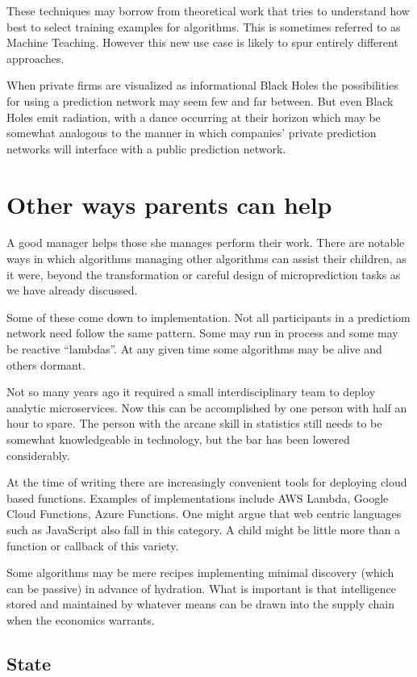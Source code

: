 These techniques may borrow from theoretical work that tries to understand how best to select training examples for algorithms. This is sometimes referred to as Machine Teaching. However this new use case is likely to spur entirely different approaches. 

When private firms are visualized as informational Black Holes the possibilities for using a prediction network may seem few and far between. But even Black Holes emit radiation, with a dance occurring at their horizon which may be somewhat analogous to the manner in which companies' private prediction networks will interface with a public prediction network. 

\section{Other ways parents can help}

A good manager helps those she manages perform their work. There are notable ways in which algorithms managing other algorithms can assist their children, as it were, beyond the transformation or careful design of microprediction tasks as we have already discussed. 

Some of these come down to implementation. Not all participants in a predictiom network need follow the same pattern. Some may run in process and some may be reactive ``lambdas''. At any given time some algorithms may be alive and others dormant. 

Not so many years ago it required a small interdisciplinary team to deploy analytic microservices. Now this can be accomplished by one person with half an hour to spare. The person with the arcane skill in statistics still needs to be somewhat knowledgeable in technology, but the bar has been lowered considerably. 

At the time of writing there are increasingly convenient tools for deploying cloud based functions. Examples of implementations include AWS Lambda, Google Cloud Functions, Azure Functions. One might argue that web centric languages such as JavaScript also fall in this category. A child might be little more than a function or callback of this variety. 

Some algorithms may be mere recipes implementing minimal discovery (which can be passive) in advance of hydration. What is important is that intelligence stored and maintained by whatever means can be drawn into the supply chain when the economics warrants.

\subsection{State}

